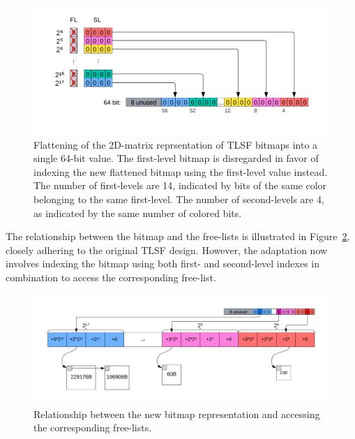 \begin{figure}[H]
    \centering
    \includegraphics[width=1\textwidth]{figures/bitmap_flattening.png}
    \caption{Flattening of the 2D-matrix reprsentation of TLSF bitmaps into a single 64-bit value. The first-level bitmap is disregarded in favor of indexing the new flattened bitmap using the first-level value instead. The number of first-levels are 14, indicated by bits of the same color belonging to the same first-level. The number of second-levels are 4, as indicated by the same number of colored bits.}
    \label{fig:bitmap_flattening}
\end{figure}

The relationship between the bitmap and the free-lists is illustrated in Figure~\ref{fig:bitmap_relationship}, closely adhering to the original TLSF design. However, the adaptation now involves indexing the bitmap using both first- and second-level indexes in combination to access the corresponding free-list.

\begin{figure}[H]
    \centering
    \includegraphics[width=1\textwidth]{figures/bitmap_relationship.png}
    \caption{Relationship between the new bitmap representation and accessing the corresponding free-lists.}
    \label{fig:bitmap_relationship}
\end{figure}




